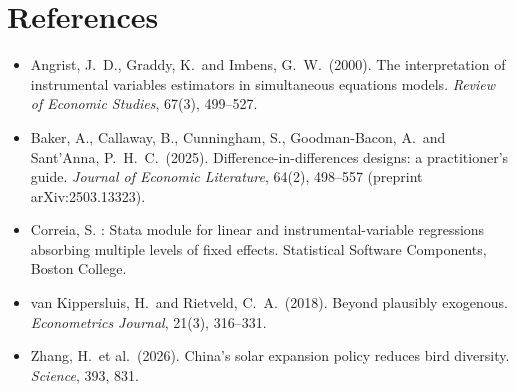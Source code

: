 \documentclass[11pt]{article}
\begin{document}
\section*{References}
{\small
\begin{itemize}[leftmargin=12pt,label={}]
\item Angrist, J.\ D., Graddy, K.\ and Imbens, G.\ W.\ (2000). The interpretation of instrumental variables estimators in simultaneous equations models. \textit{Review of Economic Studies}, 67(3), 499--527.
\item Baker, A., Callaway, B., Cunningham, S., Goodman-Bacon, A.\ and Sant'Anna, P.\ H.\ C.\ (2025). Difference-in-differences designs: a practitioner's guide. \textit{Journal of Economic Literature}, 64(2), 498--557 (preprint arXiv:2503.13323).
\item Correia, S. : Stata module for linear and instrumental-variable regressions absorbing multiple levels of fixed effects. Statistical Software Components, Boston College.
\item van Kippersluis, H.\ and Rietveld, C.\ A.\ (2018). Beyond plausibly exogenous. \textit{Econometrics Journal}, 21(3), 316--331.
\item Zhang, H.\ et al.\ (2026). China's solar expansion policy reduces bird diversity. \textit{Science}, 393, 831.
\end{itemize}}
\end{document}
